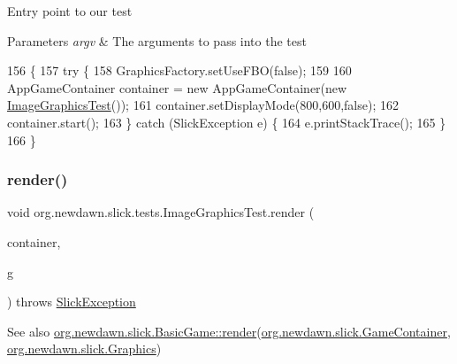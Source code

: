 Entry point to our test


\begin{DoxyParams}{Parameters}
{\em argv} & The arguments to pass into the test \\
\hline
\end{DoxyParams}

\begin{DoxyCode}
156                                            \{
157         \textcolor{keywordflow}{try} \{
158             GraphicsFactory.setUseFBO(\textcolor{keyword}{false});
159             
160             AppGameContainer container = \textcolor{keyword}{new} AppGameContainer(\textcolor{keyword}{new} 
      \mbox{\hyperlink{classorg_1_1newdawn_1_1slick_1_1tests_1_1_image_graphics_test_a0d09d132277916b2a98c6ddb088ff07c}{ImageGraphicsTest}}());
161             container.setDisplayMode(800,600,\textcolor{keyword}{false});
162             container.start();
163         \} \textcolor{keywordflow}{catch} (SlickException e) \{
164             e.printStackTrace();
165         \}
166     \}
\end{DoxyCode}
\mbox{\label{classorg_1_1newdawn_1_1slick_1_1tests_1_1_image_graphics_test_a08dd35007f428d559c5fd864245ba0ad}} 
\subsubsection{\texorpdfstring{render()}{render()}}
{\footnotesize\ttfamily void org.\+newdawn.\+slick.\+tests.\+Image\+Graphics\+Test.\+render (\begin{DoxyParamCaption}\item[{\mbox{\hyperlink{classorg_1_1newdawn_1_1slick_1_1_game_container}{Game\+Container}}}]{container,  }\item[{\mbox{\hyperlink{classorg_1_1newdawn_1_1slick_1_1_graphics}{Graphics}}}]{g }\end{DoxyParamCaption}) throws \mbox{\hyperlink{classorg_1_1newdawn_1_1slick_1_1_slick_exception}{Slick\+Exception}}\hspace{0.3cm}{\ttfamily [inline]}}

\begin{DoxySeeAlso}{See also}
\mbox{\hyperlink{interfaceorg_1_1newdawn_1_1slick_1_1_game_af1a4670d43eb3ba04dfcf55ab1975b64}{org.\+newdawn.\+slick.\+Basic\+Game\+::render}}(\mbox{\hyperlink{classorg_1_1newdawn_1_1slick_1_1_game_container}{org.\+newdawn.\+slick.\+Game\+Container}}, \mbox{\hyperlink{classorg_1_1newdawn_1_1slick_1_1_graphics}{org.\+newdawn.\+slick.\+Graphics}}) 
\end{DoxySeeAlso}


